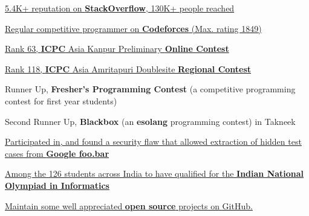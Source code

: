 \vspace{-2mm}
\vspace{3mm}
\begin{cvitems}
  \item \href{https://stackoverflow.com/users/4121347/dryairship?tab=profile}{5.4K+ reputation on \textbf{StackOverflow}, 130K+ people reached} \hfill {}
  \item \href{https://codeforces.com/profile/dryairship}{Regular competitive programmer on  \textbf{Codeforces} (Max. rating 1849)} \hfill {}
  \item \href{https://icpc.baylor.edu/ICPCID/DAOIPZ63CM1P}{Rank 63, \textbf{ICPC} Asia Kanpur Preliminary \textbf{Online Contest}} \hfill {}
  \item \href{https://icpc.baylor.edu/ICPCID/DAOIPZ63CM1P}{Rank 118, \textbf{ICPC} Asia Amritapuri Doublesite \textbf{Regional Contest}} \hfill {}
  \item Runner Up, \textbf{Fresher's Programming Contest} (a competitive programming contest for first year students) \hfill {}
  \item Second Runner Up, \textbf{Blackbox} (an \textbf{esolang} programming contest) in Takneek \hfill {}
  \item \href{https://dryairship.github.io/post/how-i-extracted-hidden-test-cases-in-google-foobar/}{Participated in, and found a security flaw that allowed extraction of hidden test cases from \textbf{Google foo.bar}} \hfill {}
  \item \href{https://www.iarcs.org.in/inoi/2018/zio2018/results_zio2018.php#Allahabad}{Among the 126 students across India to have qualified for the \textbf{Indian National Olympiad in Informatics}} \hfill\textit\hfill {}
  \item \href{https://github.com/dryairship/}{Maintain some well appreciated \textbf{open source} projects on GitHub.}
\end{cvitems}
\vspace{2mm}